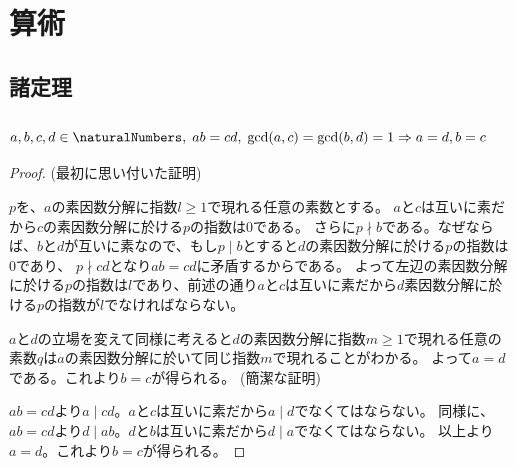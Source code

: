\chapter{算術}
    \section{諸定理}
        \subsection{\texorpdfstring{$a,b,c,d\in\naturalNumbers,\;ab=cd,\;\gcd(a,c)=\gcd(b,d)=1 \Rightarrow a=d,b=c$}{a,b,c,dは自然数, ab=cd, gcd(a,c)=gcd(b,d)=1 ⇔ a=d,b=c}}
            \label{互いに素な2組の数と積の関係}
            \begin{proof}
                \quad\newline
                (最初に思い付いた証明)
                \par
                $p$を、$a$の素因数分解に指数$l\geq1$で現れる任意の素数とする。
                $a$と$c$は互いに素だから$c$の素因数分解に於ける$p$の指数は0である。
                さらに$p\nmid b$である。なぜならば、$b$と$d$が互いに素なので、もし$p\mid b$とすると$d$の素因数分解に於ける$p$の指数は0であり、
                $p\nmid cd$となり$ab=cd$に矛盾するからである。
                よって左辺の素因数分解に於ける$p$の指数は$l$であり、前述の通り$a$と$c$は互いに素だから$d$素因数分解に於ける$p$の指数が$l$でなければならない。
                \par
                $a$と$d$の立場を変えて同様に考えると$d$の素因数分解に指数$m\geq1$で現れる任意の素数$q$は$a$の素因数分解に於いて同じ指数$m$で現れることがわかる。
                よって$a=d$である。これより$b=c$が得られる。
                \newline
                \newline
                (簡潔な証明)
                \par
                $ab=cd$より$a\mid cd$。$a$と$c$は互いに素だから$a\mid d$でなくてはならない。
                同様に、$ab=cd$より$d\mid ab$。$d$と$b$は互いに素だから$d\mid a$でなくてはならない。
                以上より$a=d$。これより$b=c$が得られる。
            \end{proof}
